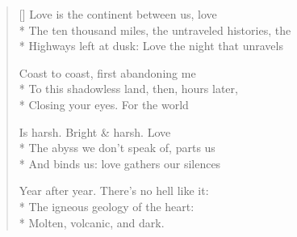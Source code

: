 \label{ch:subduction}
\settowidth{\versewidth}{The ten thousand miles, the untraveled histories, the}
\begin{verse}[\versewidth]
Love is the continent between us, love\\*
The ten thousand miles, the untraveled histories, the\\*
Highways left at dusk: Love the night that unravels

Coast to coast, first abandoning me\\*
To this shadowless land, then, hours later,\\*
Closing your eyes. For the world

Is harsh.  Bright \& harsh. Love\\*
The abyss we don't speak of, parts us\\*
And binds us: love gathers our silences

Year after year.  There's no hell like it:\\*
The igneous geology of the heart:\\*
Molten, volcanic, and dark.
\end{verse}
